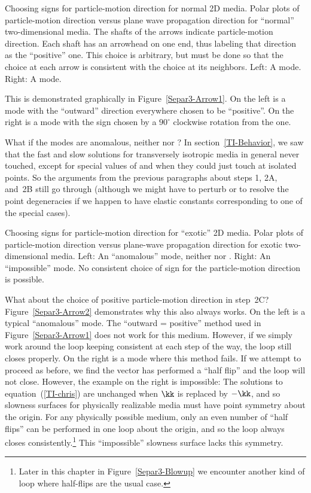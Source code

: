 {Choosing signs for particle-motion direction for normal 2D media.}
{
Polar plots of particle-motion direction versus plane wave propagation
direction for ``normal'' two-dimensional media.
The shafts of the arrows indicate particle-motion direction.
Each shaft has an arrowhead on one end,
thus labeling that direction as the ``positive'' one.
This choice is arbitrary, but must be done so that the choice
at each arrow is consistent with the choice at its neighbors.
Left: A {\qP} mode.
Right: A {\qS} mode.
}

This is demonstrated graphically in Figure~\ref{Separ3-Arrow1}.
On the left
is a {\qP} mode with the ``outward'' direction everywhere chosen
to be ``positive''.
On the right is a {\qS} mode with the sign chosen
by a $90^\circ$ clockwise rotation from the {\qP} one.

What if the modes are anomalous, neither {\qP} nor {\qS}?
In section~\ref{TI-Behavior}, we saw that the fast and slow solutions
for transversely isotropic media in general never touched, except for
special values of {\cac} and {\cee} when they could just touch at isolated
points.
So the arguments from the previous paragraphs about
steps 1, 2A, and~2B
still go through (although
we might have to perturb {\cac} or {\cee} to resolve the point degeneracies
if we happen to have elastic constants corresponding to one of the
special cases).

{Choosing signs for particle-motion direction for ``exotic'' 2D media.}
{
Polar plots of particle-motion direction versus plane-wave propagation
direction for exotic two-dimensional media.
Left: An ``anomalous'' mode, neither {\qP} nor {\qS}.
Right: An ``impossible'' mode. No consistent choice of sign
for the particle-motion direction is possible.
}

What about the choice of positive particle-motion direction in step~2C?
Figure~\ref{Separ3-Arrow2} demonstrates why this also always works.
On the left is a typical ``anomalous'' mode. The ``outward = positive''
method used in Figure~\protect\ref{Separ3-Arrow1} does not work for this
medium. However, if we simply work around the loop keeping consistent at
each step of the way, the loop still closes properly.
On the right is a mode where this method fails.
If we attempt to proceed as before,
we find the vector has performed a ``half flip''
and the loop will not close.
However, the example on the right is impossible:
The solutions to equation~(\protect\ref{TI-chris})
are unchanged when $\kk$ is replaced by $-\kk$, and so
slowness surfaces for physically realizable media must have
point symmetry about the origin.
For any physically possible medium,
only an even number of ``half flips'' can be performed in one loop
about the origin, and so the loop always closes
consistently.\footnote{
Later in this chapter in Figure~\protect\ref{Separ3-Blowup}
we encounter another kind of loop
where half-flips are the usual case.
}
This ``impossible'' slowness surface lacks
this symmetry.

